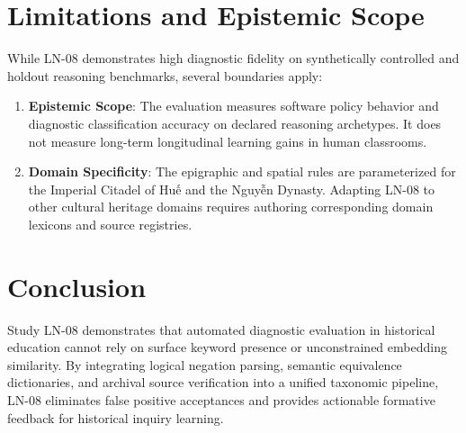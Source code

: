 \documentclass[11pt,a4paper]{article}
\begin{document}
\section{Limitations and Epistemic Scope}
While LN-08 demonstrates high diagnostic fidelity on synthetically controlled and holdout reasoning benchmarks, several boundaries apply:
\begin{enumerate}[leftmargin=*]
    \item \textbf{Epistemic Scope}: The evaluation measures software policy behavior and diagnostic classification accuracy on declared reasoning archetypes. It does not measure long-term longitudinal learning gains in human classrooms.
    \item \textbf{Domain Specificity}: The epigraphic and spatial rules are parameterized for the Imperial Citadel of Huế and the Nguyễn Dynasty. Adapting LN-08 to other cultural heritage domains requires authoring corresponding domain lexicons and source registries.
\end{enumerate}

\section{Conclusion}
Study LN-08 demonstrates that automated diagnostic evaluation in historical education cannot rely on surface keyword presence or unconstrained embedding similarity. By integrating logical negation parsing, semantic equivalence dictionaries, and archival source verification into a unified taxonomic pipeline, LN-08 eliminates false positive acceptances and provides actionable formative feedback for historical inquiry learning.
\end{document}
